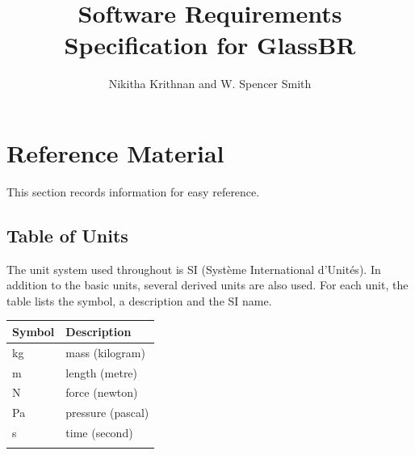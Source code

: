 \documentclass[12pt]{article}
\title{Software Requirements Specification for GlassBR}
\author{Nikitha Krithnan and W. Spencer Smith}
\begin{document}
\maketitle
\tableofcontents
\newpage
\section{Reference Material}
\label{Sec:RefMat}
This section records information for easy reference.
\subsection{Table of Units}
\label{Sec:ToU}
The unit system used throughout is SI (Système International d'Unités). In addition to the basic units, several derived units are also used. For each unit, the table lists the symbol, a description and the SI name.
\begin{longtable*}{l l}
\toprule
Symbol & Description
\\
\midrule
\endhead
kg & mass (kilogram)
\\
m & length (metre)
\\
N & force (newton)
\\
Pa & pressure (pascal)
\\
s & time (second)
\\
\bottomrule
\label{Table:ToU}
\end{longtable*}
\end{document}
